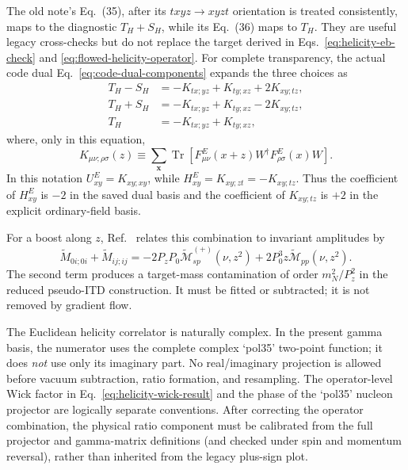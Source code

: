 \documentclass[11pt]{article}
\numberwithin{equation}{section}
\DeclareMathOperator{\Tr}{Tr}
\begin{document}
The old note's Eq.~(35), after its \(txyz\to xyzt\) orientation is treated
consistently, maps to the diagnostic \(T_H+S_H\), while its Eq.~(36) maps to
\(T_H\).  They are useful legacy cross-checks but do not replace the target
derived in Eqs.~\eqref{eq:helicity-eb-check} and
\eqref{eq:flowed-helicity-operator}.
For complete transparency, the actual code dual
Eq.~\eqref{eq:code-dual-components} expands the three choices as
\begin{align}
 T_H-S_H
 &=-K_{tx;yz}+K_{ty;xz}+2K_{xy;tz},\nonumber\\
 T_H+S_H
 &=-K_{tx;yz}+K_{ty;xz}-2K_{xy;tz},\nonumber\\
 T_H
 &=-K_{tx;yz}+K_{ty;xz},
 \label{eq:helicity-three-component-expansion}
\end{align}
where, only in this equation,
\[
 K_{\mu\nu;\rho\sigma}(z)
 \equiv\sum_{\bm x}\Tr\!\left[
 F^E_{\mu\nu}(x+z)W^\dagger F^E_{\rho\sigma}(x)W\right].
\]
In this notation \(U^E_{xy}=K_{xy;xy}\), while
\(H^E_{xy}=K_{xy;zt}=-K_{xy;tz}\).  Thus the coefficient of \(H^E_{xy}\)
is \(-2\) in the saved dual basis and the coefficient of \(K_{xy;tz}\)
is \(+2\) in the explicit ordinary-field basis.

For a boost along \(z\), Ref.~\cite{EgererEtAl2022GluonHelicity} relates this
combination to invariant amplitudes by
\begin{equation}
  \widetilde M_{0i;0i}+\widetilde M_{ij;ij}
  =-2P_zP_0\widetilde{\mathcal M}_{sp}^{(+)}(\nu,z^2)
   +2P_0^3z\widetilde{\mathcal M}_{pp}(\nu,z^2).
  \label{eq:helicity-invariant-amplitudes}
\end{equation}
The second term produces a target-mass contamination of order
\(m_N^2/P_z^2\) in the reduced pseudo-ITD construction.  It must be fitted or
subtracted; it is not removed by gradient flow.

The Euclidean helicity correlator is naturally complex.  In the present gamma
basis, the numerator uses the complete complex `pol35' two-point function;
it does \emph{not} use only its imaginary part.  No real/imaginary projection
is allowed before vacuum subtraction, ratio formation, and resampling.  The
operator-level Wick factor in Eq.~\eqref{eq:helicity-wick-result} and the
phase of the `pol35' nucleon projector are logically separate conventions.
After correcting the operator combination, the physical ratio component must
be calibrated from the full projector and gamma-matrix definitions (and
checked under spin and momentum reversal), rather than inherited from the
legacy plus-sign plot.
\end{document}

